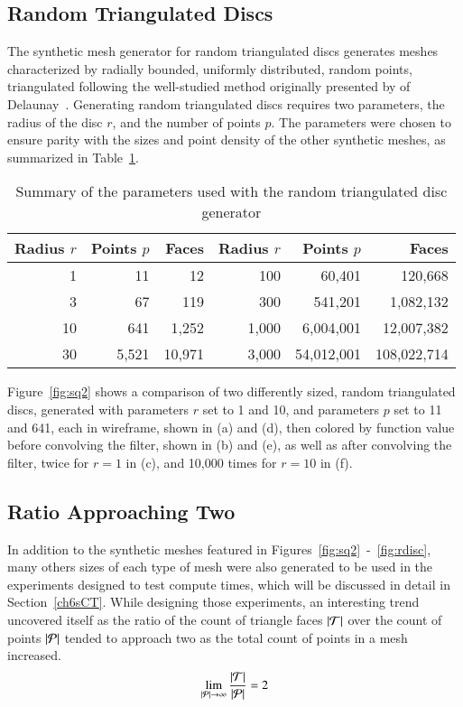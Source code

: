 \subsection{Random Triangulated Discs}
The synthetic mesh generator for random triangulated discs generates meshes characterized by radially bounded, uniformly distributed, random points,  triangulated following the well-studied method originally presented by of Delaunay~\cite{Delaunay34}. Generating random triangulated discs requires two parameters, the radius of the disc $r$, and the number of points $p$. The parameters were chosen to ensure parity with the sizes and point density of the other synthetic meshes, as summarized in Table~\ref{tbl:rdisc}.
\vspace*{-.5\baselineskip}
\begin{table}[ht]
\begin{tabular}{rrr|rrr}
\textbf{Radius $r$} & \textbf{Points $p$} & \textbf{Faces} & \textbf{Radius $r$} & \textbf{Points $p$} & \textbf{Faces}\\
\hline
    1 &         11 &          12 &   100 &     60,401 &     120,668\\
    3 &         67 &         119 &   300 &    541,201 &   1,082,132\\
   10 &        641 &       1,252 & 1,000 &  6,004,001 &  12,007,382\\
   30 &      5,521 &      10,971 & 3,000 & 54,012,001 & 108,022,714%
\caption{Summary of the parameters used with the random triangulated disc generator\label{tbl:rdisc}}
\end{tabular}
\end{table}

Figure~\ref{fig:sq2} shows a comparison of two differently sized, random triangulated discs, generated with parameters $r$ set to 1 and 10, and parameters $p$ set to 11 and 641, each in wireframe, shown in (a) and (d), then colored by function value before convolving the filter, shown in (b) and (e), as well as after convolving the filter, twice for $r=1$ in (c), and 10,000 times for $r=10$ in (f).
\vspace*{-\baselineskip}


%
%
%
%
\pagebreak
\subsection{Ratio Approaching Two}
In addition to the synthetic meshes featured in Figures~\ref{fig:sq2}~-~\ref{fig:rdisc}, many others sizes of each type of mesh were also generated to be used in the experiments designed to test compute times, which will be discussed in detail in Section~\ref{ch6sCT}. While designing those experiments, an interesting trend uncovered itself as the ratio of the count of triangle faces $|\mathcal{T}|$ over the count of points $|\mathcal{P}|$ tended to approach two as the total count of points in a mesh increased.
\begin{equation}
	\lim_{|\mathcal{P}| \rightarrow \infty}{\frac{|\mathcal{T}|}{|\mathcal{P}|}} = 2
	\label{eq:ratioApproachesTwo}
\end{equation}

